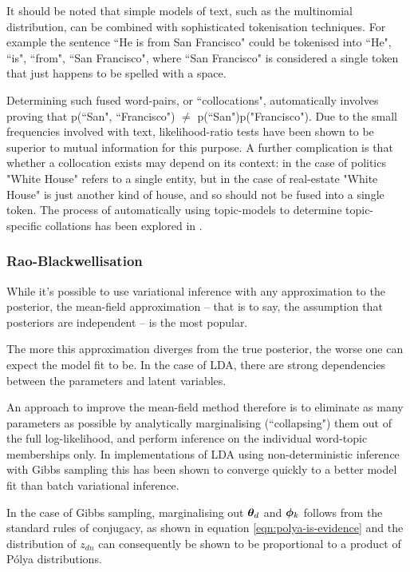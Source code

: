 It should be noted that simple models of text, such as the multinomial distribution, can be combined with sophisticated tokenisation techniques. For example the sentence ``He is from San Francisco" could be tokenised into {``He", ``is", ``from", ``San Francisco"}, where ``San Francisco" is considered a single token that just happens to be spelled with a space.

Determining such fused word-pairs, or ``collocations", automatically  involves proving that p(``San", ``Francisco") $\neq$ p(``San")p("Francisco"). Due to the small frequencies involved with text, likelihood-ratio tests have been shown to be superior to mutual information for this purpose\cite{Dunning1993}. A further complication is that whether a collocation exists may depend on its context: in the case of politics "White House" refers to a single entity, but in the case of real-estate "White House" is just another kind of house, and so should not be fused into a single token. The process of automatically using topic-models to determine topic-specific collations has been explored in \cite{Johnson2010}.


\subsubsection{Rao-Blackwellisation}
While it's possible to use variational inference with any approximation to the posterior, the mean-field approximation -- that is to say, the assumption that posteriors are independent -- is the most popular. 

The more this approximation diverges from the true posterior, the worse one can expect the model fit to be. In the case of LDA, there are strong dependencies between the parameters and latent variables.

An approach to improve the mean-field method therefore is to eliminate as many parameters as possible by analytically marginalising (``collapsing") them out of the full log-likelihood, and perform inference on the individual word-topic memberships only. In implementations of LDA using non-deterministic inference with Gibbs sampling\cite{Griffiths2004} this has been shown to converge quickly to a better model fit than batch variational inference\cite{Asuncion2012}.

In the case of Gibbs sampling, marginalising out ${ \bm \theta_d }$ and $\bm \phi_k$ follows from the standard rules of conjugacy, as shown in equation \eqref{eqn:polya-is-evidence} and the distribution of $z_{dn}$ can consequently be shown\cite{Griffiths2004}\cite{Heinrich2005} to be proportional to a product of P\'olya distributions.

